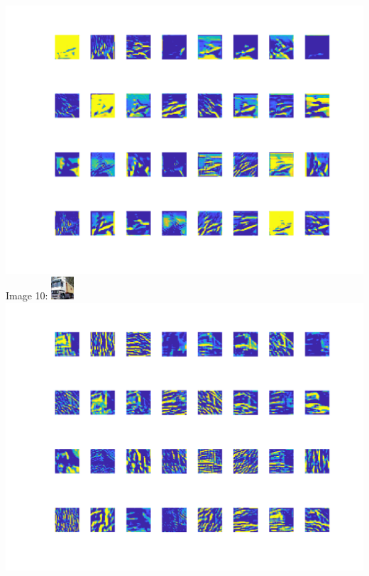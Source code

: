 \documentclass[10pt]{article}
\begin{document}
\includegraphics[scale=0.65]{9_filter_res}\\
\newpage
Image 10:
\includegraphics{10}\\
\includegraphics[scale=0.65]{10_filter_res}\\
\end{document}
